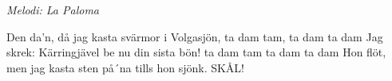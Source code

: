 {\footnotesize\textit{Melodi: La Paloma}}\par
\vspace{10pt}
Den da'n, då jag kasta svärmor i Volgasjön, ta dam tam, ta dam ta dam
Jag skrek: Kärringjävel be nu din sista bön! ta dam tam ta dam ta dam
Hon flöt, men jag kasta sten på´na tills hon sjönk.
SKÅL!
